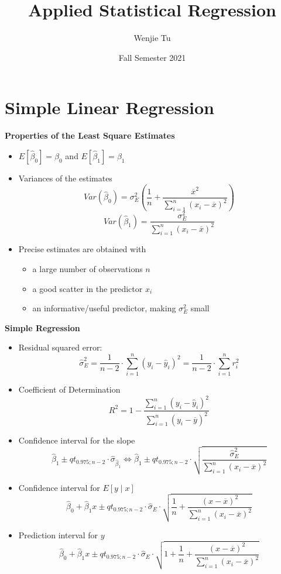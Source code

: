 \documentclass[a4paper]{article}
\title{%
    Applied Statistical Regression
}
\author{Wenjie Tu}
\date{Fall Semester 2021}
\begin{document}

\section{Simple Linear Regression}

\textbf{Properties of the Least Square Estimates}
\begin{itemize}
    \item $E[\hat{\beta}_0]=\beta_0$ and $E[\hat{\beta}_1]=\beta_1$
    \item Variances of the estimates
    \[Var(\hat{\beta}_0)=\sigma_E^2\left(\frac{1}{n}+\frac{\overline{x}^2}{\sum_{i=1}^n(x_i-\overline{x})^2} \right) \]
    \[Var(\hat{\beta}_1)=\frac{\sigma_E^2}{\sum_{i=1}^n(x_i-\overline{x})^2} \]
    \item Precise estimates are obtained with
    \begin{itemize}
        \item a large number of observations $n$
        \item a good scatter in the predictor $x_i$
        \item an informative/useful predictor, making $\sigma_E^2$ small
    \end{itemize}
\end{itemize}

\textbf{Simple Regression}
\begin{itemize}
    \item Residual squared error:
    \[\hat{\sigma}_E^2=\frac{1}{n-2}\cdot\sum_{i=1}^n(y_i-\hat{y}_i)^2=\frac{1}{n-2}\cdot\sum_{i=1}^n r_i^2 \]
    \item Coefficient of Determination
    \[R^2=1-\frac{\sum_{i=1}^n(y_i-\hat{y}_i)^2}{\sum_{i=1}^n(y_i-\overline{y})^2} \]
    \item Confidence interval for the slope
    \[\hat{\beta}_1\pm qt_{0.975;n-2}\cdot\hat{\sigma}_{\hat{\beta}_1}\Longleftrightarrow \hat{\beta}_1\pm qt_{0.975;n-2}\cdot\sqrt{\frac{\hat{\sigma}_E^2}{\sum_{i=1}^n(x_i-\overline{x})^2}} \]
    \item Confidence interval for $E[y\mid x]$
    \[\hat{\beta}_0+\hat{\beta}_1x\pm qt_{0.975;n-2}\cdot\hat{\sigma}_E\cdot\sqrt{\frac{1}{n}+\frac{(x-\overline{x})^2}{\sum_{i=1}^n(x_i-\overline{x})^2}} \]
    \item Prediction interval for $y$
    \[\hat{\beta}_0+\hat{\beta}_1x\pm qt_{0.975;n-2}\cdot\hat{\sigma}_E\cdot\sqrt{1+\frac{1}{n}+\frac{(x-\overline{x})^2}{\sum_{i=1}^n(x_i-\overline{x})^2}} \]
\end{itemize}
\end{document}
